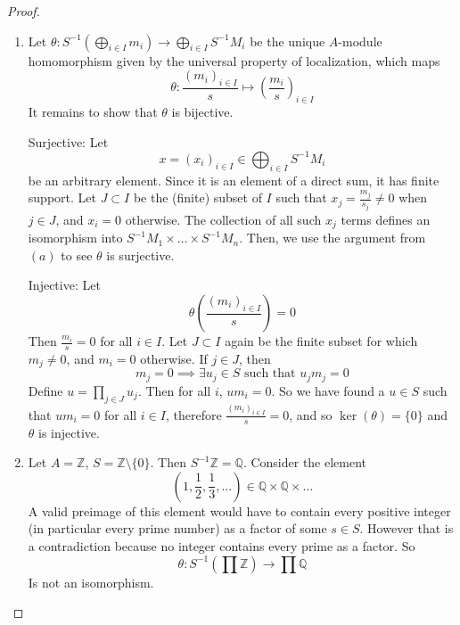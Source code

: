 \documentclass[hidelinks,12pt]{article}
\newcommand{\Z}{\mathbb{Z}}
\newcommand{\Q}{\mathbb{Q}}
\begin{document}
\begin{proof}
\begin{enumerate}[label=(\alph*).]
\[\]
So \(\theta\) is surjective.\par Injective: Let \(\theta\left(\frac{(m_{1},\dots,m_{n})}{s}\right)=\theta\left(\frac{(m_{1}',\dots,m_{n}')}{t}\right)\). So \[
    \left(\frac{m_{1}}{s},\dots,\frac{m_{n}}{s}\right)=\left(\frac{m_{1}'}{t},\dots,\frac{m_{n}'}{t}\right)
\]
Then componentwise, \(\frac{m_{i}}{s}=\frac{m_{i}'}{t}\implies \exists u_{i}\in S\) such that
\[
    u_{i}(m_{i}t-m_{i}'s)=0
\]
Then let \(u=\prod_{i}u_{i}\). Clearly \(u\in S\), and \[
    u(m_{i}t-m_{i}'s)=0
\]
For all \(i\in I\) simultaneously. So \[
    u\left[(m_{1},\dots,m_{n})t-(m_{1}',\dots,m_{n}')s\right]=0
\]
Therefore \[
\frac{(m_{1},\dots,m_{n})}{s}=\frac{(m_{1}',\dots,m_{n}')}{t}
\]
As required.
\par Alternatively: Let \(\theta\left(\frac{(m_{1},\dots,m_{n})}{s}\right)=0\). Then \(\frac{m_{i}}{s}=0\) for all \(i\). Therefore \[
\frac{(m_{1},\dots,m_{n})}{s}=0
\]
so \(\ker(\theta)=\{0\}\), and so \(\theta\) is injective.
    \item Let \(\theta:S^{-1}\left(\bigoplus_{i\in I}m_{i}\right)\to\bigoplus_{i\in I}S^{-1}M_{i}\) be the unique \(A\)-module homomorphism given by the universal property of localization, which maps \[
    \theta: \frac{(m_{i})_{i\in I}}{s}\mapsto \left(\frac{m_{i}}{s}\right)_{i\in I}
    \]
    It remains to show that \(\theta\) is bijective.\par Surjective: Let
    \[
        x=(x_{i})_{i\in I}\in\bigoplus_{i\in I}S^{-1}M_{i}
    \]
    be an arbitrary element. Since it is an element of a direct sum, it has finite support. Let \(J\subset I\) be the (finite) subset of \(I\) such that \(x_{j}=\frac{m_{j}}{s_{j}}\neq0\) when \(j\in J\), and \(x_{i}=0\) otherwise. The collection of all such \(x_{j}\) terms defines an isomorphism into \(S^{-1}M_{1}\times\dots\times S^{-1}M_{n}\). Then, we use the argument from \((a)\) to see \(\theta\) is surjective.\par Injective: Let \[
    \theta\left(\frac{(m_{i})_{i\in I}}{s}\right)=0
    \]
   Then \(\frac{m_{i}}{s}=0\) for all \(i\in I\). Let \(J\subset I\) again be the finite subset for which \(m_{j}\neq0\), and \(m_{i}=0\) otherwise. If \(j\in J\), then \[
       m_{j}=0\implies\exists u_{j}\in S\text{ such that }u_{j}m_{j}=0
   \]
   Define \(u=\prod_{j\in J}u_{j}\). Then for all \(i\), \(um_{i}=0\). So we have found a \(u\in S\) such that \(um_{i}=0\) for all \(i\in I\), therefore \(\frac{(m_{i})_{i\in I}}{s}=0\), and so \(\ker\left(\theta\right)=\{0\}\) and \(\theta\) is injective.
\item Let \(A=\Z\), \(S=\Z\setminus\{0\}\). Then \(S^{-1}\Z=\Q\). Consider the element \[
        \left(1,\frac{1}{2},\frac{1}{3},\dots\right)\in\Q\times\Q\times\dots
\]
A valid preimage of this element would have to contain every positive integer (in particular every prime number) as a factor of some \(s\in S\). However that is a contradiction because no integer contains every prime as a factor. So \[
\theta:S^{-1}\left(\prod\Z\right)\to\prod\Q
\]
Is not an isomorphism.
\end{enumerate}
\end{proof}
\end{document}
